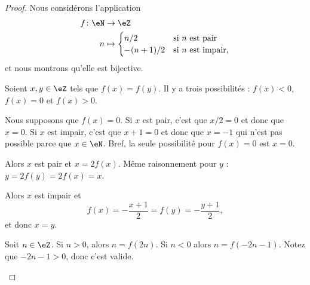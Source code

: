 \begin{proof}
	Nous considérons l'application
	\begin{equation}
		\begin{aligned}
			f\colon \eN & \to \eZ                                         \\
			n           & \mapsto \begin{cases}
				                      n/2      & \text{si \( n\) est pair}    \\
				                      -(n+1)/2 & \text{si \( n\) est impair,}
			                      \end{cases}
		\end{aligned}
	\end{equation}
	et nous montrons qu'elle est bijective.
	\begin{subproof}
		Soient \( x,y\in \eZ\) tels que \( f(x)=f(y)\). Il y a trois possibilités : \( f(x)<0\), \( f(x)=0\) et \( f(x)>0\).
		\begin{subproof}
			\spitem[Si \( f(x)=0\)]
			Nous supposons que \( f(x)=0\). Si \( x \) est pair, c'est que \( x/2=0\) et donc que \( x=0\). Si \( x\) est impair, c'est que \( x+1=0\) et donc que \( x=-1\) qui n'est pas possible parce que \( x\in \eN\). Bref, la seule possibilité pour \( f(x)=0\) est \( x=0\).

			\spitem[Si \( f(x)<0\)]
			Alors \( x\) est pair et \( x=2f(x)\). Même raisonnement pour \( y\) : \( y=2f(y)=2f(x)=x\).

			\spitem[Si \( f(x)<0\)]
			Alors \( x\) est impair et
			\begin{equation}
				f(x)=-\frac{ x+1 }{ 2 }=f(y)=-\frac{ y+1 }{ 2 },
			\end{equation}
			et donc \( x=y\).
		\end{subproof}

		Soit \( n\in \eZ\). Si \( n>0\), alors \( n=f(2n)\). Si \( n<0\) alors \( n=f(-2n-1)\). Notez que \( -2n-1>0\), donc c'est valide.
	\end{subproof}
\end{proof}


